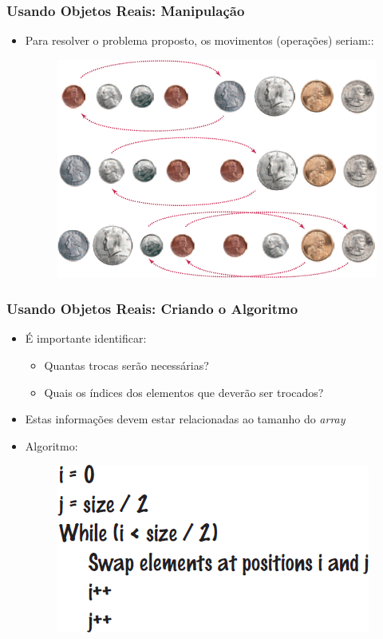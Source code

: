 \documentclass[xcolor={dvipsnames,table},aspectratio=169]{beamer}
\begin{document}
\begin{frame}\frametitle{Usando Objetos Reais: Manipulação}
\begin{itemize}
	\item Para resolver o problema proposto, os movimentos (operações) seriam::
\begin{figure}[h]
	\includegraphics[height=0.50\paperheight,center]{pucrs-ep-fprog-unidade_06-arrays-laminas-algoritmo_com_moedas.png}
\end{figure}
\end{itemize}
\end{frame}

\begin{frame}\frametitle{Usando Objetos Reais: Criando o Algoritmo}
\begin{itemize}
	\item É importante identificar:
	\begin{itemize}
		\item Quantas trocas serão necessárias?
		\item Quais os índices dos elementos que deverão ser trocados?
	\end{itemize}
	\item Estas informações devem estar relacionadas ao tamanho do \emph{array}
	\item Algoritmo:
\begin{figure}[h]
	\includegraphics[height=0.3\paperheight,center]{pucrs-ep-fprog-unidade_06-arrays-laminas-algoritmo_final.png}
\end{figure}
\end{itemize}
\end{frame}
\end{document}
